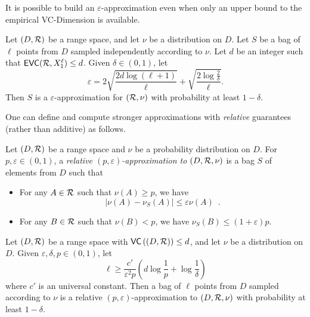 It is possible to build an $\varepsilon$-approximation even when only an upper
bound to the empirical VC-Dimension is available.
\begin{theorem}\label{thm:eapproxempir}
  Let $(D,\mathcal{R})$ be a range space, and let $\nu$ be a distribution on $D$. Let
  $S$ be a bag of $\ell$ points from $D$ sampled independently according
  to $\nu$. Let $d$ be an integer such that $\mathsf{EVC}(\mathcal{R},X_1^\ell)\le d$.
  Given $\delta\in(0,1)$, let 
  \begin{equation}\label{eq:evceapprox}
    \varepsilon =
    2\sqrt{\frac{2d\log(\ell+1)}{\ell}}+\sqrt{\frac{2\log\frac{2}{\delta}}{\ell}}.
  \end{equation}
   Then $S$ is a $\varepsilon$-approximation for $(\mathcal{R},\nu)$
   with probability at least $1-\delta$.
 \end{theorem}

One can define and compute stronger approximations with \emph{relative}
guarantees (rather than additive) as follows.
\begin{definition}\label{def:releapprox}
  Let $(D,\mathcal{R})$ be a range space  and $\nu$ be a probability distribution on
  $D$. For $p,\varepsilon\in (0,1)$, a \emph{relative
  $(p,\varepsilon)$-approximation to $(D,\mathcal{R},\nu)$} is a bag $S$ of elements
  from $D$ such that 
  \begin{itemize}
    \item For any $A\in\mathcal{R}$ such that $\nu(A)\ge p$, we have 
      \[ |\nu(A) - \nu_S(A)|\le \varepsilon\nu(A)\enspace.\]
    \item For any $B\in\mathcal{R}$ such that $\nu(B)< p$, we have $\nu_S(B)\le
      (1+\varepsilon)p$.
  \end{itemize}
\end{definition}

\begin{theorem}\label{thm:releapprox}
  Let $(D,\mathcal{R})$ be a range space with $\mathsf{VC}\left((D,\mathcal{R})\right)\le d$, and
  let $\nu$ be a distribution on $D$. Given $\varepsilon,\delta,p\in(0,1)$, let 
  \begin{equation}\label{eq:releapprox}
    \ell\ge\frac{c'}{\varepsilon^2p}\left(d\log\frac{1}{p}+\log\frac{1}{\delta}\right)
  \end{equation}
  where $c'$ is an universal constant. Then a bag of $\ell$ points from $D$ sampled
  according to $\nu$ is a relative $(p,\varepsilon)$-approximation to
  $(D,\mathcal{R},\nu)$ with probability at least $1-\delta$.
\end{theorem}

